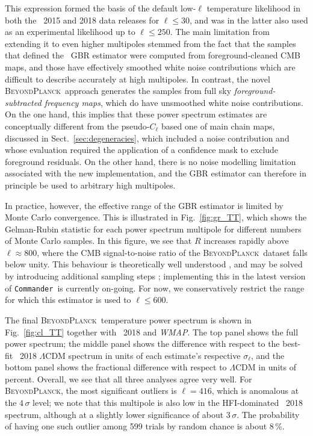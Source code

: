 \documentclass[twocolumn]{aa}
\def\WMAP{\textit{WMAP}}
\def\commander{\texttt{Commander}}
\newcommand{\red}[0]{\color{red}}
\newcommand{\BP}{\textsc{BeyondPlanck}}
\begin{document}
This expression formed the basis of the default low-$\ell$ temperature
likelihood in both the \Planck\ 2015 and 2018 data releases
\citep{planck2014-a13,planck2016-l05} for $\ell\le30$, and was in the
latter also used as an experimental likelihood up to $\ell\le250$. The
main limitation from extending it to even higher multipoles stemmed
from the fact that the samples that defined the \Planck\ GBR estimator
were computed from foreground-cleaned CMB maps, and those have
effectively smoothed white noise contributions which are difficult to
describe accurately at high multipoles. In contrast, the novel
\BP\ approach generates the samples from {\red full sky} \emph{foreground-subtracted frequency maps}, which do have unsmoothed white noise
contributions. {\red On the one hand, this implies that these power spectrum estimates are conceptually different from the pseudo-$C_\ell$ based one of main chain maps, discussed in Sect.~\ref{sec:degeneracies}, which included a noise contribution and whose evaluation required the application of a confidence mask to exclude foreground residuals. On the other hand, there} is no noise modelling limitation associated with the new implementation, and the GBR estimator can therefore in principle be used to arbitrary high multipoles.

In practice, however, the effective range of the GBR estimator is
limited by Monte Carlo convergence. This is illustrated in
Fig.~\ref{fig:gr_TT}, {\red which shows the Gelman-Rubin statistic for each power spectrum multipole for different numbers of Monte Carlo samples. In this} figure, we see that $R$ increases rapidly above $\ell\approx 800$, where the CMB
signal-to-noise ratio of the \BP\ dataset falls below unity. This
behaviour is theoretically well understood
\citep[e.g.,][]{eriksen:2004}, and may be solved by introducing
additional sampling steps \citep{jewell:2009,racine:2016};
implementing this in the latest version of \commander\ is currently
on-going. For now, we conservatively restrict the range for which this
estimator is used to $\ell\le600$. 

The final \BP\ temperature power spectrum is shown in
Fig.~\ref{fig:cl_TT} together with \Planck\ 2018 and \WMAP. The top
panel shows the full power spectrum; the middle panel shows the
difference with respect to the best-fit \Planck\ 2018 $\Lambda$CDM
spectrum in units of {\red each estimate's respective} $\sigma_{\ell}$, and the bottom panel shows the fractional difference with respect to $\Lambda$CDM in units of percent. Overall, we see that all three analyses agree very well. For
\BP, the most significant outliers is $\ell=416$, which is anomalous
at the $4\,\sigma$ level; we note that this multipole is also low in
the HFI-dominated \Planck\ 2018 spectrum, although at a slightly lower
significance of about $3\,\sigma$. The probability of having one such
outlier among 599 trials by random chance is about 8\,\%.
\end{document}
